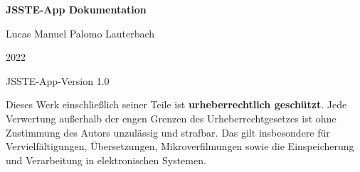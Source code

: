 \begin{titlepage}
	

\begin{center}
	
	\huge{\textbf{JSSTE-App Dokumentation}}\\[1.5ex]
	\normalsize
	
	Lucas Manuel Palomo Lauterbach 
	
	2022
	
	JSSTE-App-Version 1.0 
	
\end{center}

\vspace*{\fill}
\small
\noindent
Dieses Werk einschließlich seiner Teile ist \textbf{urheberrechtlich geschützt}.
Jede Verwertung außerhalb der engen Grenzen des Urheberrechtgesetzes ist ohne
Zustimmung des Autors unzulässig und strafbar. Das gilt insbesondere für
Vervielfältigungen, Übersetzungen, Mikroverfilmungen sowie die Einspeicherung
und Verarbeitung in elektronischen Systemen.
	
\end{titlepage}